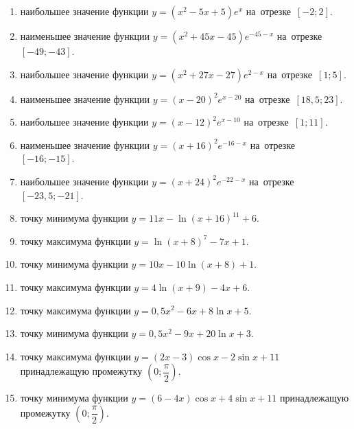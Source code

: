 \documentclass[a4paper,10pt]{article}
\begin{document}
\begin{enumerate}
\item {} наибольшее значение функции $y=\left(x^2 -5x +5\right)e^{x}$ на~отрезке~$\left[-2;2\right]$.

\item {} наименьшее значение функции $y=\left(x^2 +45x -45\right)e^{-45-x}$ на~отрезке~$\left[-49;-43\right]$.

\item {} наибольшее значение функции $y=\left(x^2 +27x -27\right)e^{2-x}$ на~отрезке~$\left[1;5\right]$.

\item {} наименьшее значение функции $y=\left(x-20\right)^2e^{x-20}$ на~отрезке~$\left[18,5;23\right]$.

\item {} наибольшее значение функции $y=\left(x-12\right)^2e^{x-10}$ на~отрезке~$\left[1;11\right]$.

\item {} наименьшее значение функции $y=\left(x+16\right)^2e^{-16-x}$ на~отрезке~$\left[-16;-15\right]$.

\item {} наибольшее значение функции $y=\left(x+24\right)^2e^{-22-x}$ на~отрезке~$\left[-23,5;-21\right]$.

\item {} точку минимума функции $y=11x-\ln\left(x+16\right)^{11}+6$.

\item {} точку максимума функции $y=\ln\left(x+8\right)^{7}-7x+1$.

\item {} точку минимума функции $y=10x-10\ln\left(x+8\right)+1$.

\item {} точку максимума функции $y=4\ln\left(x+9\right)-4x+6$.

\item {} точку максимума функции $y=0,5x^2-6x+8\ln x +5$.

\item {} точку минимума функции $y=0,5x^2-9x+20\ln x +3$.

\item {} точку максимума функции $y=\left(2x-3\right)\cos x -2\sin x+11$
принадлежащую промежутку $\left(0;\dfrac{\pi}{2}\right)$.

\item {} точку минимума функции $y=\left(6-4x\right)\cos x +4\sin x+11$
принадлежащую промежутку $\left(0;\dfrac{\pi}{2}\right)$.


\end{enumerate}
\end{document}
